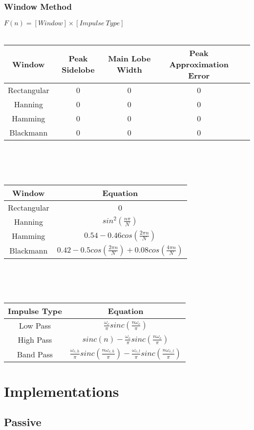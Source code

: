 \documentclass[11pt, oneside]{article}
\begin{document}
\subsubsection{Window Method}
$F(n) = [Window]\times [Impulse\ Type]$\\\\
\begin{tabular}{|c|c|c|c|c|}\hline
\bf{Window} & \bf{Peak Sidelobe} & \bf{Main Lobe Width} & \bf{Peak Approximation Error}\\\hline 
Rectangular & 0 & 0 & 0 \\\hline
Hanning & 0 & 0 & 0  \\\hline
Hamming & 0 & 0 & 0  \\\hline
Blackmann & 0 & 0 & 0  \\\hline
\end{tabular}
\\\\\\
\begin{tabular}{|c|c|}\hline
\bf{Window} & \bf{Equation}\\\hline 
Rectangular & 0 \\\hline
Hanning & $sin^2(\frac{n\pi}{N})$ \\\hline
Hamming & $0.54 - 0.46 cos(\frac{2\pi n}{N})$ \\\hline
Blackmann & $0.42 - 0.5 cos(\frac{2\pi n}{N}) + 0.08 cos(\frac{4\pi n}{N})$ \\\hline
\end{tabular}
\\\\\\
\begin{tabular}{|c|c|}\hline
\bf{Impulse Type} & \bf{Equation}\\\hline 
Low Pass & $\frac{\omega_c}{\pi}sinc(\frac{n\omega_c}{\pi})$ \\\hline
High Pass & $sinc(n) - \frac{\omega_c}{\pi}sinc(\frac{n\omega_c}{\pi})$ \\\hline
Band Pass & $\frac{\omega_{c,h}}{\pi}sinc(\frac{n\omega_{c,h}}{\pi}) - \frac{\omega_{c,l}}{\pi}sinc(\frac{n\omega_{c,l}}{\pi})$ \\\hline
\end{tabular}

\section{Implementations}
\subsection{Passive}
\end{document}
